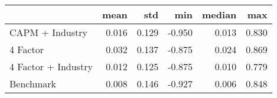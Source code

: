 \begin{tabular}{lrrrrr}
\toprule
{} &   mean &    std &    min &  median &    max \\
\midrule
 CAPM + Industry    &  0.016 &  0.129 & -0.950 &   0.013 &  0.830 \\
4 Factor            &  0.032 &  0.137 & -0.875 &   0.024 &  0.869 \\
4 Factor + Industry &  0.012 &  0.125 & -0.875 &   0.010 &  0.779 \\
Benchmark           &  0.008 &  0.146 & -0.927 &   0.006 &  0.848 \\
\bottomrule
\end{tabular}
